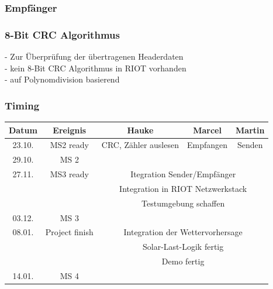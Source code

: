 \documentclass{beamer}
\begin{document}
	\begin{frame} %
		\frametitle{ Empfänger } %


 	\end{frame}

	\begin{frame}
		\frametitle{8-Bit CRC Algorithmus} %
		- Zur Überprüfung der übertragenen Headerdaten\\
		- kein 8-Bit CRC Algorithmus in RIOT vorhanden\\
		- auf Polynomdivision basierend

	\end{frame}



	\begin{frame}
		\frametitle{ Timing }
		\small
		\begin{tabular}{|c|c|c|c|c|}
			\hline
			Datum  & Ereignis & Hauke & Marcel & Martin \\
			\hline
			23.10. & MS2 ready & CRC\checked, Zähler auslesen & Empfangen\checked & Senden\checked \\
			\hline
			29.10. & MS 2 & & &\\
			\hline
			27.11. & MS3 ready & \multicolumn{3}{|c|}{ Itegration Sender/Empfänger \checked} \\
			&  & \multicolumn{3}{|c|}{ Integration in RIOT Netzwerkstack }\\
			&  & \multicolumn{3}{|c|}{ Testumgebung schaffen \checked}\\
			\hline
			03.12. & MS 3 & & & \\
			\hline
			08.01. & Project finish & \multicolumn{3}{|c|}{ Integration der Wettervorhersage } \\
			&  & \multicolumn{3}{|c|}{ Solar-Last-Logik fertig }\\
			&  & \multicolumn{3}{|c|}{ Demo fertig }\\
			\hline
			14.01. & MS 4 & & & \\
			\hline
		\end{tabular}
	\end{frame}
\end{document}
